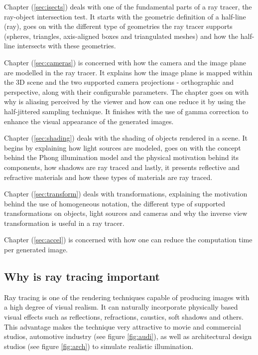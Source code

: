\documentclass{article}
\begin{document}
Chapter (\ref{sec:isects}) deals with one of the fundamental parts of a ray tracer, the ray-object intersection test. It starts with the geometric definition of a half-line (ray), goes on with the different type of geometries the ray tracer supports (spheres, triangles, axis-aligned boxes and triangulated meshes) and how the half-line intersects with these geometries.

\vspace*{\baselineskip}

Chapter (\ref{sec:cameras}) is concerned with how the camera and the image plane are modelled in the ray tracer. It explains how the image plane is mapped within the 3D scene and the two supported camera projections - orthographic and perspective, along with their configurable parameters. The chapter goes on with why is aliasing perceived by the viewer and how can one reduce it by using the half-jittered sampling technique. It finishes with the use of gamma correction to enhance the visual appearance of the generated images. 

\vspace*{\baselineskip}

Chapter (\ref{sec:shading}) deals with the shading of objects rendered in a scene. It begins by explaining how light sources are modeled, goes on with the concept behind the Phong illumination model and the physical motivation behind its components, how shadows are ray traced and lastly, it presents reflective and refractive materials and how these types of materials are ray traced.

\vspace*{\baselineskip}

Chapter (\ref{sec:transform}) deals with transformations, explaining the motivation behind the use of homogeneous notation, the different type of supported transformations on objects, light sources and cameras and why the inverse view transformation is useful in a ray tracer.

\vspace*{\baselineskip}

Chapter (\ref{sec:accel}) is concerned with how one can reduce the computation time per generated image. 

\subsection{Why is ray tracing important}
Ray tracing is one of the rendering techniques capable of producing images with a high degree of visual realism. It can naturally incorporate physically based visual effects such as reflections, refractions, caustics, soft shadows and others. This advantage makes the technique very attractive to movie and commercial studios, automotive industry (see figure \ref{fig:audi}), as well as architectural design studios (see figure \ref{fig:arch}) to simulate realistic illumination.  
\end{document}
